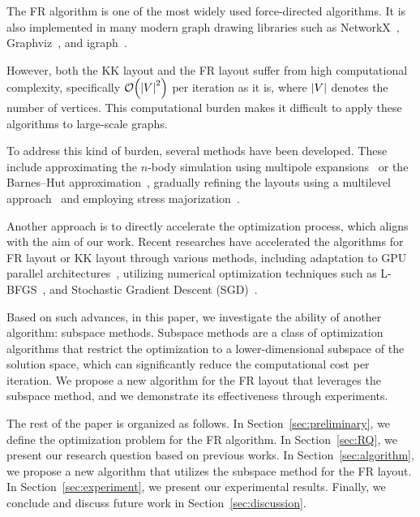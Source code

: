 \documentclass[dvipdfmx,lettersize,journal]{IEEEtran}
\begin{document}
The FR algorithm is one of the most widely used force-directed algorithms. It is also implemented in many modern graph drawing libraries such as NetworkX~\cite{osti_960616}, Graphviz~\cite{ellsonGraphvizOpenSource2002}, and igraph~\cite{csardiIgraphSoftwarePackage2006}.

However, both the KK layout and the FR layout suffer from high computational complexity, specifically $\order{\abs{V}^2}$ per iteration as it is, where $\abs{V}$ denotes the number of vertices. This computational burden makes it difficult to apply these algorithms to large-scale graphs.

To address this kind of burden, several methods have been developed. These include approximating the $n$-body simulation using multipole expansions~\cite{greengardFastAlgorithmParticle1987} or the Barnes--Hut approximation~\cite{barnesHierarchicalLogForcecalculation1986}, gradually refining the layouts using a multilevel approach~\cite{Hu2006EfficientHF} and employing stress majorization~\cite{gansnerGraphDrawingStress2005}.

Another approach is to directly accelerate the optimization process, which aligns with the aim of our work. Recent researches have accelerated the algorithms for FR layout or KK layout through various methods, including adaptation to GPU parallel architectures~\cite{gajdosParallelFruchtermanReingold2016}, utilizing numerical optimization techniques such as L-BFGS~\cite{6183577}, and Stochastic Gradient Descent (SGD)~\cite{8419285}.

Based on such advances, in this paper, we investigate the ability of another algorithm: subspace methods.
Subspace methods are a class of optimization algorithms that restrict the optimization to a lower-dimensional subspace of the solution space, which can significantly reduce the computational cost per iteration.
We propose a new algorithm for the FR layout that leverages the subspace method, and we demonstrate its effectiveness through experiments.

The rest of the paper is organized as follows.
In Section~\ref{sec:preliminary}, we define the optimization problem for the FR algorithm.
In Section~\ref{sec:RQ}, we present our research question based on previous works.
In Section~\ref{sec:algorithm}, we propose a new algorithm that utilizes the subspace method for the FR layout.
In Section~\ref{sec:experiment}, we present our experimental results.
Finally, we conclude and discuss future work in Section~\ref{sec:discussion}.
\end{document}
